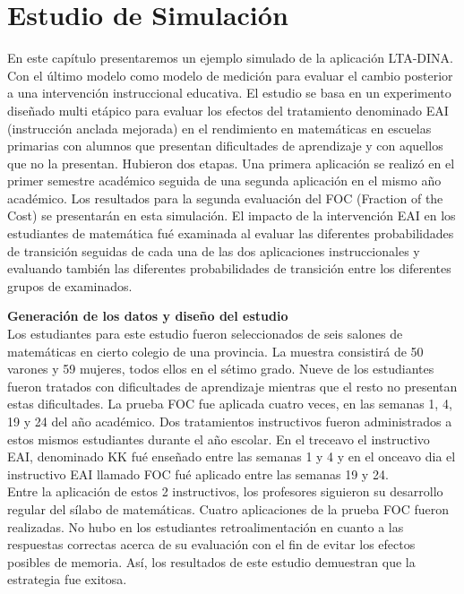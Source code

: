 \chapter{Estudio de Simulaci\'{o}n}
\label{cap:simulacion}

En este cap\'{i}tulo presentaremos un ejemplo simulado de la aplicaci\'{o}n LTA-DINA. Con el \'{u}ltimo modelo como modelo de medici\'{o}n para evaluar el cambio posterior a una intervenci\'{o}n instruccional educativa. El estudio se basa en un experimento dise\~{n}ado multi et\'{a}pico para evaluar los efectos del tratamiento denominado EAI (instrucci\'{o}n anclada mejorada) en el rendimiento en matem\'{a}ticas en escuelas primarias con alumnos que presentan dificultades de aprendizaje y con aquellos que no la presentan.
Hubieron dos etapas. Una primera aplicaci\'{o}n se realiz\'{o} en el primer semestre acad\'{e}mico seguida de una segunda aplicaci\'{o}n en el mismo a\~{n}o acad\'{e}mico. Los resultados para la segunda evaluaci\'{o}n del FOC (Fraction of the Cost) se presentar\'{a}n en esta simulaci\'{o}n. El impacto de la intervenci\'{o}n EAI en los estudiantes de matem\'{a}tica fu\'{e} examinada al evaluar las diferentes probabilidades de transici\'{o}n seguidas de cada una de las dos aplicaciones instruccionales y evaluando tambi\'{e}n las diferentes probabilidades de transici\'{o}n  entre los diferentes grupos de examinados. 

\noindent
\textbf{Generaci\'{o}n de los datos y dise\~{n}o del estudio}\\
Los estudiantes para este estudio fueron seleccionados de seis salones de matem\'{a}ticas en cierto colegio de una provincia. La muestra consistir\'{a} de 50 varones y 59 mujeres, todos ellos en el s\'{e}timo grado. Nueve de los estudiantes fueron tratados con dificultades de aprendizaje mientras que el resto no presentan estas dificultades.
La prueba FOC fue aplicada cuatro veces, en las semanas 1, 4, 19 y 24 del a\~{n}o acad\'{e}mico. Dos tratamientos instructivos fueron administrados a estos mismos estudiantes durante el a\~{n}o escolar. En el treceavo el instructivo EAI, denominado KK fu\'{e} ense\~{n}ado entre las semanas 1 y 4 y en el onceavo dia el instructivo EAI llamado FOC fu\'{e} aplicado entre las semanas 19 y 24.\\
Entre la aplicaci\'{o}n de estos 2 instructivos, los profesores siguieron su desarrollo regular del s\'{i}labo de matem\'{a}ticas. Cuatro aplicaciones de la prueba FOC fueron realizadas. No hubo en los  estudiantes retroalimentaci\'{o}n en cuanto a las respuestas correctas acerca de su evaluaci\'{o}n con el fin de evitar los efectos posibles de memoria. As\'{i}, los resultados de este estudio demuestran que la estrategia fue exitosa.\\

